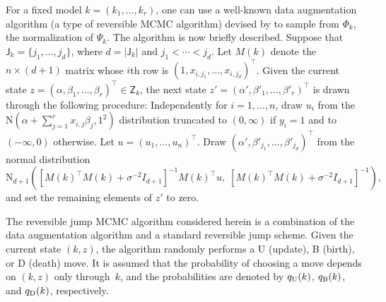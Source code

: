 \documentclass[12pt]{article}
\newcommand{\Z}{\mathsf{Z}}
\begin{document}
For a fixed model $k=(k_1,\dots,k_r)$, one can use a well-known data augmentation algorithm (a type of reversible MCMC algorithm) devised by \cite{albert1993bayesian} to sample from $\Phi_k$, the normalization of $\Psi_k$.
	The algorithm is now briefly described.
	Suppose that $\mathsf{J}_k = \{j_1, \dots, j_d\}$, where $d = |\mathsf{J}_k|$ and $j_1 < \cdots < j_d$.
	Let $M(k)$ denote the $n \times (d+1)$ matrix whose $i$th row is $(1, x_{i,j_1}, \dots, x_{i,j_d} )^{\top}$.
	Given the current state $z = (\alpha, \beta_1, \dots, \beta_r)^{\top} \in \Z_k$, the next state $z'= (\alpha', \beta'_1, \dots, \beta'_r)^{\top}$ is drawn through the following procedure:
	Independently for $i = 1,\dots,n$, draw $u_i$ from the $\mbox{N}( \alpha + \sum_{j=1}^r x_{i,j} \beta_j , 1^2 )$ distribution truncated to $(0,\infty)$ if $y_i = 1$ and to $(-\infty,0)$ otherwise.
	Let $u = (u_1, \dots, u_n)^{\top}$.
	Draw $(\alpha', \beta'_{j_1}, \dots, \beta'_{j_d})^{\top}$ from the normal distribution
	\[
	\mbox{N}_{d+1} \left( \left[M(k)^{\top}M(k) + \sigma^{-2} I_{d+1} \right]^{-1} M(k)^{\top} u, \; \left[M(k)^{\top} M(k) + \sigma^{-2} I_{d+1} \right]^{-1}  \right),
	\]
	and set the remaining elements of $z'$ to zero.



The reversible jump MCMC algorithm considered herein is a combination of the data augmentation algorithm and a standard reversible jump scheme.
Given the current state $(k,z)$, the algorithm randomly performs a U (update), B (birth), or D (death) move.
It is assumed that the probability of choosing a move depends on $(k,z)$ only through~$k$, and the probabilities are denoted by $q_{\scriptsize\mbox{U}}(k)$, $q_{\scriptsize\mbox{B}}(k)$, and $q_{\scriptsize\mbox{D}}(k)$, respectively.
\end{document}
